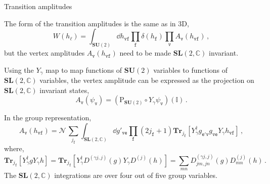 \documentclass[12pt,titlepage]{article}
\begin{document}
\begin{frame}{Transition amplitudes}
    \begin{list}{\,}{\leftmargin=1em \itemindent=0em}
        \item<1-> The form of the transition amplitudes is the same as in 3D,
        \begin{equation}
            W(h_\ell)=\int_{{\mathbf{SU}(2)}}\dd{h_\mathtt{vf}}\prod_\mathtt{f}\delta(h_\mathtt{f})\prod_\mathtt{v}A_\mathtt{v}(h_\mathtt{vf})\,,
        \end{equation}
        but the vertex amplitudes $A_\mathtt{v}(h_\mathtt{vf})$ need to be made $\mathbf{SL}(2,\mathbb{C})$ invariant.
        \item<2-> Using the $Y_\gamma$ map to map functions of $\mathbf{SU}(2)$ variables to functions of $\mathbf{SL}(2,\mathbb{C})$ variables, the vertex amplitude can be expressed as the projection on $\mathbf{SL}(2,\mathbb{C})$ invariant states,
        \begin{equation}
            A_\mathtt{v}(\psi_\mathtt{v})=(\operatorname{P_{\mathbf{SU}(2)}}\circ Y_\gamma\psi_\mathtt{v})(\mathbb{I})\,.
        \end{equation}
        \item<3-> In the group representation,
        \begin{equation}\label{vert_amp_4d}
            A_\mathtt{v}(h_\mathtt{vf})=\mathcal{N}\,\sum_{j_\mathtt{f}}\int_{{\mathbf{SL}(2,\mathbb{C})}}\dd{g'_\mathtt{ve}}\prod_\mathtt{f}(2j_\mathtt{f}+1)\mathbf{Tr}_{j_\mathtt{f}}[Y_\gamma^\dagger g_\mathtt{e'v}g_\mathtt{ve}Y_\gamma h_\mathtt{vf}]\,,
        \end{equation}
        where,
        \begin{equation}
            \mathbf{Tr}_{j_\mathtt{f}}[Y_\gamma^\dagger g Y_\gamma h]=\mathbf{Tr}_{j_\mathtt{f}}[Y_\gamma^\dagger D^{(\gamma j,j)}(g) Y_\gamma D^{(j)}(h)]= \sum_{mn}D^{(\gamma j,j)}_{jm,jn}(g) D^{(j)}_{mn}(h)\,.
        \end{equation}
        The $\mathbf{SL}(2,\mathbb{C})$ integrations are over four out of five group variables.
    \end{list}
\end{frame}
\end{document}
